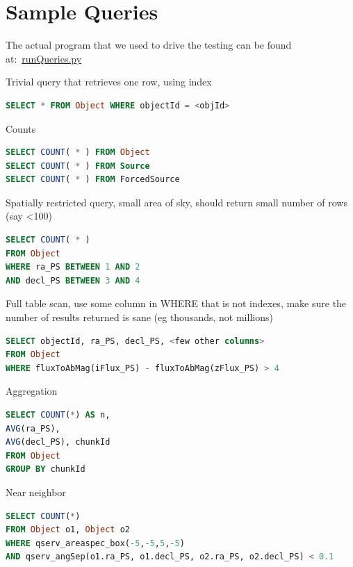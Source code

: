 \documentclass[DM,toc]{lsstdoc}
\begin{document}
\section{Sample Queries}\label{sample-queries}

The actual program that we used to drive the testing can be found
at:~\href{https://github.com/lsst-dm/db_tests_summer15/blob/tickets/DM-3364/DM-3364/runQueries.py}{runQueries.py}

Trivial query that retrieves one row, using index

\begin{lstlisting}[language=SQL]
SELECT * FROM Object WHERE objectId = <objId>
\end{lstlisting}

Counts

\begin{lstlisting}[language=SQL]
SELECT COUNT( * ) FROM Object
SELECT COUNT( * ) FROM Source
SELECT COUNT( * ) FROM ForcedSource
\end{lstlisting}

Spatially restricted query, small area of sky, should return small
number of rows (say \textless{}100)

\begin{lstlisting}[language=SQL]
SELECT COUNT( * )
FROM Object
WHERE ra_PS BETWEEN 1 AND 2
AND decl_PS BETWEEN 3 AND 4
\end{lstlisting}

Full table scan, use some column in WHERE that is not indexes, make sure
the number of results returned is sane (eg thousands, not millions)

\begin{lstlisting}[language=SQL]
SELECT objectId, ra_PS, decl_PS, <few other columns>
FROM Object
WHERE fluxToAbMag(iFlux_PS) - fluxToAbMag(zFlux_PS) > 4
\end{lstlisting}

Aggregation

\begin{lstlisting}[language=SQL]
SELECT COUNT(*) AS n,
AVG(ra_PS),
AVG(decl_PS), chunkId
FROM Object
GROUP BY chunkId
\end{lstlisting}

Near neighbor

\begin{lstlisting}[language=SQL]
SELECT COUNT(*)
FROM Object o1, Object o2
WHERE qserv_areaspec_box(-5,-5,5,-5)
AND qserv_angSep(o1.ra_PS, o1.decl_PS, o2.ra_PS, o2.decl_PS) < 0.1
\end{lstlisting}
\end{document}
